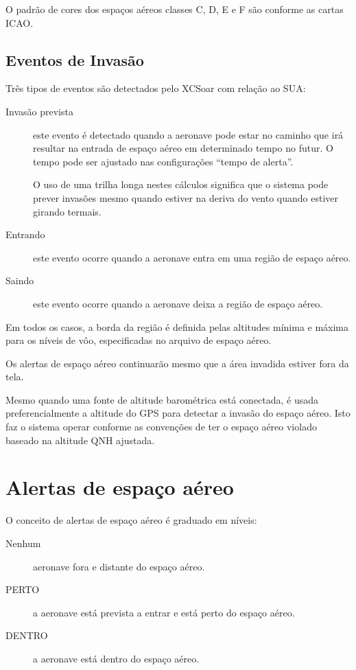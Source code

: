 O padrão de cores dos espaços aéreos classes C, D, E e F são conforme as cartas ICAO. 


\subsection*{Eventos de Invasão}

Três tipos de eventos são detectados pelo XCSoar com relação ao SUA:
\begin{description}
\item[Invasão prevista] este evento é detectado quando a aeronave pode estar no caminho que irá resultar na entrada de espaço aéreo em determinado tempo no futur.  O tempo pode ser ajustado nas configurações “tempo de alerta”.

O uso de uma trilha longa nestes cálculos significa que o sistema pode prever invasões mesmo quando estiver na deriva do vento quando estiver girando termais.



\item[Entrando] este evento ocorre quando a aeronave entra em uma região de espaço aéreo.
\item[Saindo] este evento ocorre quando a aeronave deixa a região de espaço aéreo.
\end{description}
Em todos os casos, a borda da região é definida pelas altitudes mínima e máxima para os níveis de vôo, especificadas no arquivo de espaço aéreo.

Os alertas de espaço aéreo continuarão mesmo que a área invadida estiver fora da tela.

Mesmo quando uma fonte de altitude barométrica está conectada, é usada preferencialmente a altitude do GPS para detectar a invasão do espaço aéreo.  Isto faz o sistema operar conforme as convenções de ter o espaço aéreo violado baseado na altitude QNH ajustada.



\section{Alertas de espaço aéreo }

O conceito de alertas de espaço aéreo é graduado em níveis:
\begin{description}
\item[Nenhum] aeronave fora e distante do espaço aéreo.
\item[\colorbox{AirspaceYellow}{PERTO}] a aeronave está prevista a entrar e está perto do espaço aéreo.
\item[\colorbox{AirspaceRed}{DENTRO}] a aeronave está dentro do espaço aéreo.
\end{description}

